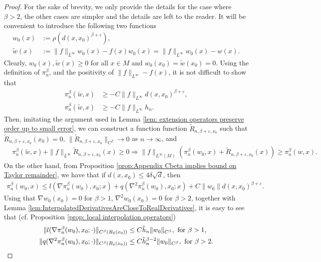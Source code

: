 \documentclass[11pt,reqno]{amsart}
\numberwithin{equation}{section}
\theoremstyle{plain}
\begin{document}
\begin{proof}
 For the sake of brevity, we only provide the details for the case where $\beta>2$, the other cases are simpler and the details are left to the reader. It will be convenient to introduce the following two functions 
  \begin{align*}
    w_0(x) & := \rho(d(x,x_0)^{\beta+\varepsilon}),\\	  
    \tilde w(x) & := \|f\|_{L^\infty}w_0(x)-f(x)w_0(x) = \|f\|_{L^\infty}w_0(x)-w(x).
  \end{align*}
  Clearly, $w_0(x), \tilde w(x)\geq 0$ for all $x\in M$ and $w_0(x_0) = \tilde w(x_0)=0$.  Using the definition of $\pi_n^\beta$, and the positivity of $\|f\|_{L^\infty}-f(x)$, it is not difficult to show that
  \begin{align*}
    \pi_n^\beta( \tilde w,x) & \geq -C\|f\|_{L^\infty}d(x,x_0)^{\beta+\varepsilon},\\
    \pi_n^\beta( \tilde w,x) & \geq -C\|f\|_{L^\infty}h_n.	
  \end{align*}
  Then, imitating the argument used in Lemma \ref{lem: extension operators preserve order up to small error}, we can construct a function function $\tilde R_{n,\beta+\varepsilon,x_0}$ such that $\tilde R_{n,\beta+\varepsilon,x_0}(x_0)=0$, $\|\tilde R_{n,\beta+\varepsilon,x_0}\|_{C^\beta} \to 0$ as $n\to\infty$, and
    \begin{align*}
      & \pi_n^\beta(\tilde w,x)+\|f\|_{L^\infty}\tilde R_{n,\beta+\varepsilon,x_0}(x) \geq 0 \Rightarrow \|f\|_{L^\infty(M)}(\pi_n^\beta(w_0,x)+\tilde R_{n,\beta+\varepsilon,x_0}(x)) \geq \pi_n^\beta(w,x).
    \end{align*}
  On the other hand, from Proposition \ref{prop:Appendix Cbeta implies bound on Taylor remainder}, we have that if $d(x,x_0)\leq 4\delta \sqrt{d}$, then
  \begin{align*}
    \pi_n^\beta(w_0,x) \leq l( \nabla \pi_n^\beta(w_0),x_0;x)+q( \nabla^2 \pi_n^\beta(w_0),x_0;x)+C\|w_0\|d(x,x_0)^{\beta+\varepsilon}.
  \end{align*}
  Using that $\nabla w_0(x_0)=0$ for $\beta>1$, $\nabla^2 w_0(x_0)=0$ for $\beta>2$, together with Lemma \ref{lem:InterpolatedDerivativesAreCloseToRealDerivatives}, it is easy to see that (cf. Proposition \ref{prop: local interpolation operators})
  \begin{align*}
    \| l( \nabla \pi_n^\beta(w_0),x_0;\cdot)\|_{C^\beta(B_{\delta}(x_0))} & \leq C\tilde h_n \|w_0\|_{C^\beta},\textnormal{ for } \beta>1,\\
    \| q( \nabla^2 \pi_n^\beta(w_0),x_0;\cdot)\|_{C^\beta(B_{\delta}(x_0))} & \leq C\tilde h_n^{\beta-2}\|w_0\|_{C^\beta},\textnormal{ for } \beta>2.

\end{align*}
\end{proof}
\end{document}
